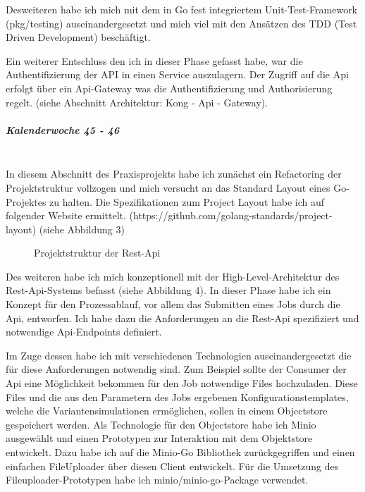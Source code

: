 \documentclass[12pt]{article}
\begin{document}
Desweiteren habe ich mich mit dem in Go fest integriertem Unit-Test-Framework (pkg/testing) \cite{GO-TEST} auseinandergesetzt und mich viel mit den Ansätzen des TDD (Test Driven Development) beschäftigt.

Ein weiterer Entschluss den ich in dieser Phase gefasst habe, war die Authentifizierung der API in einen Service auszulagern. Der Zugriff auf die Api erfolgt über ein Api-Gateway was die Authentifizierung und Authorisierung regelt. (siehe Abschnitt Architektur: Kong - Api - Gateway).

\subparagraph{Kalenderwoche 45 - 46}\mbox{}\\

In diesem Abschnitt des Praxisprojekts habe ich zunächst ein Refactoring der Projektstruktur vollzogen und mich versucht an das Standard Layout eines Go-Projektes zu halten. Die Spezifikationen zum Project Layout habe ich auf folgender Website ermittelt. (https://github.com/golang-standards/project-layout) (siehe Abbildung 3)
\bigbreak
\renewcommand*\DTstylecomment{\rmfamily\color{red}\textsc}
\begin{figure}[h!]
\centering
{}
\caption{Projektstruktur der Rest-Api}
\end{figure}

\bigbreak
Des weiteren habe ich mich konzeptionell mit der High-Level-Architektur des Rest-Api-Systems befasst (siehe Abbildung 4). In dieser Phase habe ich ein Konzept für den Prozessablauf, vor allem das Submitten eines Jobs durch die Api, entworfen. Ich habe dazu die Anforderungen an die Rest-Api spezifiziert und notwendige Api-Endpoints definiert.

Im Zuge dessen habe ich mit verschiedenen Technologien auseinandergesetzt die für diese Anforderungen notwendig sind. Zum Beispiel sollte der Consumer der Api eine Möglichkeit bekommen für den Job notwendige Files hochzuladen. Diese Files und die aus den Parametern des Jobs ergebenen Konfigurationstemplates, welche die Variantensimulationen ermöglichen, sollen in einem Objectstore gespeichert werden. Als Technologie für den Objectstore habe ich Minio ausgewählt und einen Prototypen zur Interaktion mit dem Objektstore entwickelt. Dazu habe ich auf die Minio-Go Bibliothek zurückgegriffen und einen einfachen FileUploader über diesen Client entwickelt. Für die Umsetzung des Fileuploader-Prototypen habe ich minio/minio-go-Package verwendet. \cite{MINIO-GO}
\end{document}
